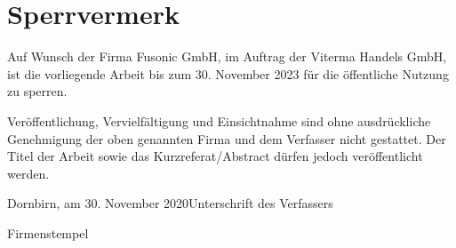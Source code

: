 \documentclass[a4paper,12pt,twoside]{scrreprt}
\begin{document}
\onehalfspacing %

\thispagestyle{empty}

\section*{Sperrvermerk}
\label{sec:sperrvermerk}
Auf Wunsch der Firma Fusonic GmbH, im Auftrag der Viterma Handels GmbH, ist die vorliegende Arbeit bis zum 30. November 2023 für die öffentliche Nutzung zu sperren.

Veröffentlichung, Vervielfältigung und Einsichtnahme sind ohne ausdrückliche Genehmigung der oben genannten Firma und dem Verfasser nicht gestattet. Der Titel der Arbeit sowie das Kurzreferat/Abstract dürfen jedoch veröffentlicht werden.

\vspace{5cm}

\noindent Dornbirn, am 30. November 2020\hfill Unterschrift des Verfassers

\vspace{5cm}

\hfill Firmenstempel\hspace{0.8cm}
\end{document}
